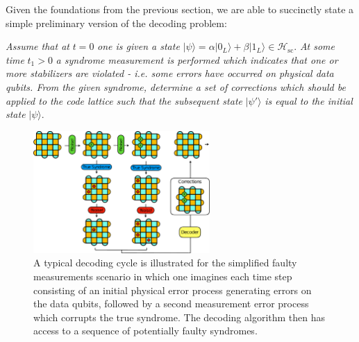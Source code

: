\documentclass[twocolumn,preprintnumbers,amsmath,amssymb,notitlepage,nofootinbib,longbibliography,superscriptaddress,aps,pra,10pt]{revtex4-1}
\begin{document}
	Given the foundations from the previous section, we are able to succinctly state a simple preliminary version of the decoding problem: \newline

	\noindent\textit{Assume that at} $t=0$  \textit{one is given a state} $|\psi\rangle = \alpha |0_L\rangle + \beta |1_L\rangle \in \mathcal{H}_{\mathrm{sc}}.$ \textit{At some time }$t_1>0$ \textit{a syndrome measurement is performed which indicates that one or more stabilizers are violated - i.e. some errors have occurred on physical data qubits. From the given syndrome, determine a set of corrections which should be applied to the code lattice such that the subsequent state} $|\psi'\rangle$ \textit{is equal to the initial state} $|\psi\rangle.$ \newline

	\begin{figure}
		\centering
		\includegraphics[width=0.6\textwidth]{figures/decoding_problem.pdf}
		\caption{
			A typical decoding cycle is illustrated for the simplified faulty measurements scenario in which one imagines each time step consisting of an initial physical error process generating errors on the data qubits, followed by a second measurement error process which corrupts the true syndrome.
			The decoding algorithm then has access to a sequence of potentially faulty syndromes.
		}
		\label{f:decoding_problem}
	\end{figure}
\end{document}
